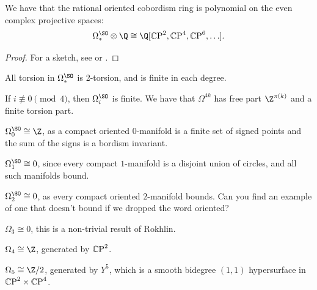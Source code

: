 \documentclass[11pt]{book}
\begin{document}
\begin{theorem}[Thom]
\label{thm:Q-algebra-generators-rational-omega-SO} 
We have that the rational oriented cobordism ring is polynomial on the even complex projective spaces:
\begin{align*}
    \Omega_\ast^\SO \otimes\Q \cong \Q[\CP^2,\CP^4,\CP^6, \ldots].
\end{align*}
\end{theorem}
\begin{proof} For a sketch, see \cite[Lecture~12]{Freed-bordism} or \cite[\S16]{MilnorStasheff}.
\end{proof}

\begin{theorem} All torsion in $\Omega^{\SO}_\ast$ is 2-torsion, and is finite in each degree.
\end{theorem}

\begin{theorem} If $i\not\equiv 0\pmod{4}$, then $\Omega^\SO_i$ is finite. We have that $\Omega^{4k}$ has free part $\Z^{\pi(k)}$ and a finite torsion part.
\end{theorem}

\begin{example} $\Omega^\SO_0\cong \Z$, as a compact oriented $0$-manifold is a finite set of signed points and the sum of the signs is a bordism invariant.
\end{example}

\begin{example} $\Omega^\SO_1\cong 0$, since every compact $1$-manifold is a disjoint union of circles, and all such manifolds bound. 
\end{example}

\begin{example} $\Omega^\SO_2\cong 0$, as every compact oriented $2$-manifold bounds. Can you find an example of one that doesn't bound if we dropped the word oriented?
\end{example}

\begin{example} $\Omega_3\cong 0$, this is a non-trivial result of Rokhlin.
\end{example}

\begin{example} $\Omega_4\cong \Z$, generated by ${\mathbb{C}\text{P}}^2$.
\end{example}

\begin{example} $\Omega_5 \cong \Z/2$, generated by $Y^5$, which is a smooth bidegree $(1,1)$ hypersurface in ${\mathbb{C}\text{P}}^2 \times {\mathbb{C}\text{P}}^4$.
\end{example}
\end{document}
